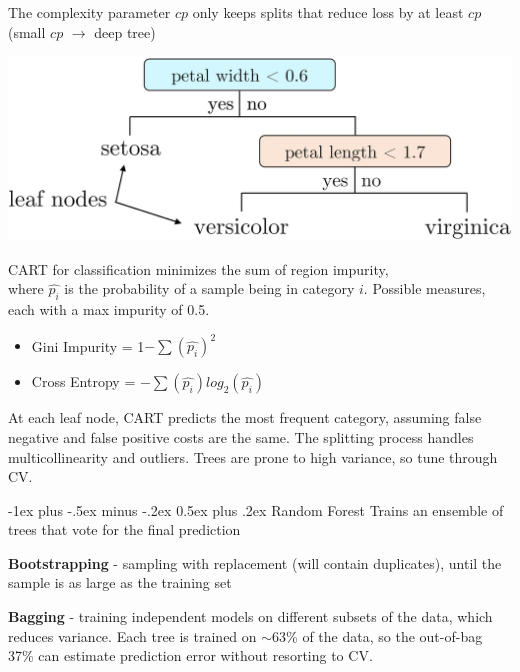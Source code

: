 \documentclass[10pt,landscape]{article}
\makeatletter
\renewcommand{\subsection}{\@startsection{subsection}{2}{0mm}%
                                {-1ex plus -.5ex minus -.2ex}%
                                {0.5ex plus .2ex}%
                                {\normalfont\normalsize\bfseries}}
\makeatother
\begin{document}
\begin{multicols}{3}
    The complexity parameter $cp$ only keeps splits that reduce loss by at least $cp$ (small $cp$ $\to$ deep tree)
    \smallskip
    \begin{center}
        \vspace{-1mm}
        \includegraphics[scale = .08]{images/CART.JPG}
    \end{center}
    \vspace{-2mm}
    CART for classification minimizes the sum of region impurity, \\
    where $\hat{p_i}$ is the probability of a sample being in category $i$.
    Possible measures, each with a max impurity of 0.5.
    \begin{itemize}[label={--},leftmargin=4mm]
        \vspace{-1mm}
        \itemsep -.4mm
        \item Gini Impurity = 1$ - \sum (\hat{p_i})^2$
        \item Cross Entropy = $-\sum (\hat{p_i}) log_2(\hat{p_i})$
    \end{itemize}
    At each leaf node, CART predicts the most frequent category, assuming false negative and false positive costs are the same. The splitting process handles multicollinearity and outliers. Trees are prone to high variance, so tune through CV.

    \subsection{Random Forest}
    Trains an ensemble of trees that vote for the final prediction

    \textbf{Bootstrapping} - sampling with replacement (will contain duplicates), until the sample is as large as the training set

    \textbf{Bagging} - training independent models on different subsets of the data, which reduces variance. Each tree is trained on $\sim$63\% of the data, so the out-of-bag 37\% can estimate prediction error without resorting to CV.


\end{multicols}
\end{document}

